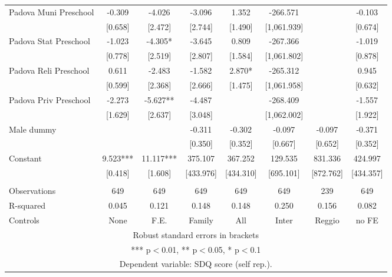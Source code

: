 \begin{tabular}{lccccccc}
Padova Muni Preschool & -0.309 & -4.026 & -3.096 & 1.352 & -266.571 &  & -0.103 \\
 & [0.658] & [2.472] & [2.744] & [1.490] & [1,061.939] &  & [0.674] \\
Padova Stat Preschool & -1.023 & -4.305* & -3.645 & 0.809 & -267.366 &  & -1.019 \\
 & [0.778] & [2.519] & [2.807] & [1.584] & [1,061.802] &  & [0.878] \\
Padova Reli Preschool & 0.611 & -2.483 & -1.582 & 2.870* & -265.312 &  & 0.945 \\
 & [0.599] & [2.368] & [2.666] & [1.475] & [1,061.958] &  & [0.632] \\
Padova Priv Preschool & -2.273 & -5.627** & -4.487 &  & -268.409 &  & -1.557 \\
 & [1.629] & [2.637] & [3.048] &  & [1,062.002] &  & [1.922] \\
Male dummy &  &  & -0.311 & -0.302 & -0.097 & -0.097 & -0.371 \\
 &  &  & [0.350] & [0.352] & [0.667] & [0.652] & [0.352] \\
Constant & 9.523*** & 11.117*** & 375.107 & 367.252 & 129.535 & 831.336 & 424.997 \\
 & [0.418] & [1.608] & [433.976] & [434.310] & [695.101] & [872.762] & [434.357] \\
 &  &  &  &  &  &  &  \\
Observations & 649 & 649 & 649 & 649 & 649 & 239 & 649 \\
R-squared & 0.045 & 0.121 & 0.148 & 0.148 & 0.250 & 0.156 & 0.082 \\
 Controls & None & F.E. & Family & All & Inter & Reggio & no FE \\ \hline
\multicolumn{8}{c}{ Robust standard errors in brackets} \\
\multicolumn{8}{c}{ *** p$<$0.01, ** p$<$0.05, * p$<$0.1} \\
\multicolumn{8}{c}{ Dependent variable: SDQ score (self rep.).} \\
\end{tabular}

